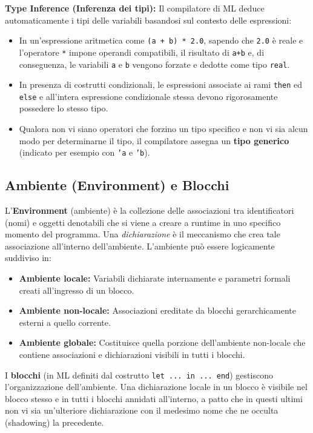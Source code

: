 \documentclass[12pt, a4paper]{article}
\begin{document}
\textbf{Type Inference (Inferenza dei tipi):}
Il compilatore di ML deduce automaticamente i tipi delle variabili basandosi sul contesto delle espressioni:
\begin{itemize}
    \item In un'espressione aritmetica come \texttt{(a + b) * 2.0}, sapendo che \texttt{2.0} è reale e l'operatore \texttt{*} impone operandi compatibili, il risultato di \texttt{a+b} e, di conseguenza, le variabili \texttt{a} e \texttt{b} vengono forzate e dedotte come tipo \texttt{real}.
    \item In presenza di costrutti condizionali, le espressioni associate ai rami \texttt{then} ed \texttt{else} e all'intera espressione condizionale stessa devono rigorosamente possedere lo stesso tipo.
    \item Qualora non vi siano operatori che forzino un tipo specifico e non vi sia alcun modo per determinarne il tipo, il compilatore assegna un \textbf{tipo generico} (indicato per esempio con \texttt{'a} e \texttt{'b}).
\end{itemize}

\subsection{Ambiente (Environment) e Blocchi}
L'\textbf{Environment} (ambiente) è la collezione delle associazioni tra identificatori (nomi) e oggetti denotabili che si viene a creare a runtime in uno specifico momento del programma. Una \textit{dichiarazione} è il meccanismo che crea tale associazione all'interno dell'ambiente.
L'ambiente può essere logicamente suddiviso in:
\begin{itemize}
    \item \textbf{Ambiente locale:} Variabili dichiarate internamente e parametri formali creati all'ingresso di un blocco.
    \item \textbf{Ambiente non-locale:} Associazioni ereditate da blocchi gerarchicamente esterni a quello corrente.
    \item \textbf{Ambiente globale:} Costituisce quella porzione dell'ambiente non-locale che contiene associazioni e dichiarazioni visibili in tutti i blocchi.
\end{itemize}
I \textbf{blocchi} (in ML definiti dal costrutto \texttt{let ... in ... end}) gestiscono l'organizzazione dell'ambiente. Una dichiarazione locale in un blocco è visibile nel blocco stesso e in tutti i blocchi annidati all'interno, a patto che in questi ultimi non vi sia un'ulteriore dichiarazione con il medesimo nome che ne occulta (shadowing) la precedente.
\end{document}
